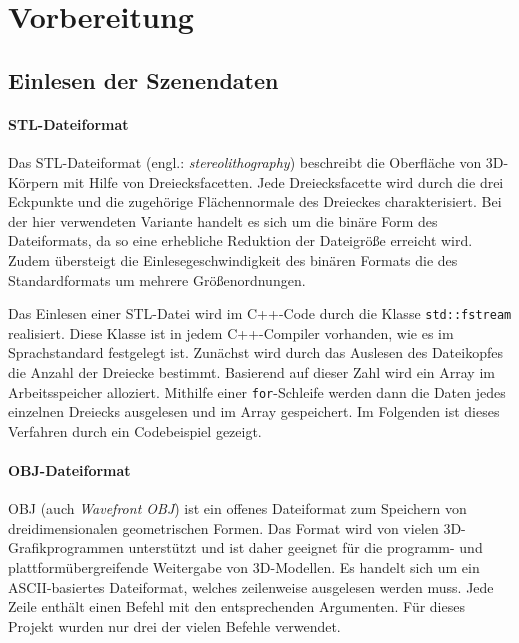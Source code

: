 \documentclass[crop=false]{standalone}
\begin{document}
  \section{Vorbereitung} %
  \label{sub:Vorbereitung}

    \subsection{Einlesen der Szenendaten} %
    \label{ssub:einlesen_der_daten}
      \paragraph{STL-Dateiformat}
      Das STL-Dateiformat (engl.: \textit{stereolithography}) beschreibt die Oberfläche von 3D-Körpern mit Hilfe von Dreiecksfacetten.
      Jede Dreiecksfacette wird durch die drei Eckpunkte und die zugehörige Flächennormale des Dreieckes charakterisiert.
      Bei der hier verwendeten Variante handelt es sich um die binäre Form des Dateiformats, da so eine erhebliche Reduktion der Dateigröße erreicht wird.
      Zudem übersteigt die Einlesegeschwindigkeit des binären Formats die des Standardformats um mehrere Größenordnungen.

      Das Einlesen einer STL-Datei wird im C++-Code durch die Klasse \texttt{std::fstream} realisiert.
      Diese Klasse ist in jedem C++-Compiler vorhanden, wie es im Sprachstandard festgelegt ist.
      Zunächst wird durch das Auslesen des Dateikopfes die Anzahl der Dreiecke bestimmt.
      Basierend auf dieser Zahl wird ein Array im Arbeitsspeicher alloziert.
      Mithilfe einer \texttt{for}-Schleife werden dann die Daten jedes einzelnen Dreiecks ausgelesen und im Array gespeichert.
      Im Folgenden ist dieses Verfahren durch ein Codebeispiel gezeigt.


      \paragraph{OBJ-Dateiformat}
      OBJ (auch \textit{Wavefront OBJ}) ist ein offenes Dateiformat zum Speichern von dreidimensionalen geometrischen Formen.
      Das Format wird von vielen 3D-Grafikprogrammen unterstützt und ist daher geeignet für die programm- und plattformübergreifende Weitergabe von 3D-Modellen.
      Es handelt sich um ein ASCII-basiertes Dateiformat, welches zeilenweise ausgelesen werden muss.
      Jede Zeile enthält einen Befehl mit den entsprechenden Argumenten.
      Für dieses Projekt wurden nur drei der vielen Befehle verwendet.
\end{document}
